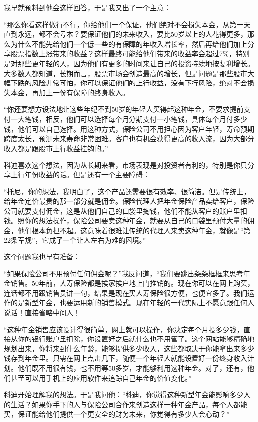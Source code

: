 我早就预料到他会这样回答，于是我又出了一个主意：

“那么你看这样做行不行，你给他们一个保证，他们绝对不会损失本金，从第一天直到永远，都不会亏本？要保证他们的未来收入，要比50岁以上的人花得更多，那么为什么不能先给他们一个低一些的有保障的年收入增长率，然后再给他们加上分享股票指数上涨带来的收益？这样最终可能给他们带来的收益率会超过7\%，特别是对那些更年轻的人，因为他们有更多的时间来让自己的投资持续地按复利增长。大多数人都知道，长期而言，股票市场会创造最高的增长，但是问题是那些股市大幅下跌的风险非常可怕，你可以保证他们的上行收益，没有下行风险，绝对不会损失本金，再加上一份有保障的终身收入。

“你还要想方设法地让这些年纪不到50岁的年轻人买得起这种年金，不要求提前支付一大笔钱，相反，他们可以选择每个月分期支付一小笔钱，具体每个月付多少钱，他们可以自己选择。用这种方式，保险公司不用担心因为客户年轻，寿命预期跨度太长，预测未来寿命非常困难。客户也有机会获得更高的收入流，因为大部分收入都是跟股市上行收益挂钩的。”

科迪喜欢这个想法，因为从长期来看，市场表现是对投资者有利的，特别是你只分享上行年份收益的话。但是还有一个主要障碍：

“托尼，你的想法，我明白了，这个产品还需要很有效率、很简洁。但是传统上，给年金定价最贵的那一部分就是佣金。保险代理人把年金保险产品卖给客户，保险公司就要支付佣金，这是从他们自己的口袋里掏钱，他们不能从客户的账户里扣钱。照你的想法操作，保险公司要卖这种年金，就要从自己的口袋里预付大量的佣金，他们根本负担不起。这意味着很难让传统的代理人来卖这种年金，就像是“第22条军规”，它成了一个让人左右为难的困境。”

这个问题我也早有准备：

“如果保险公司不用预付任何佣金呢？”我反问道，“我们要跳出条条框框来思考年金销售。50年前，人寿保险都是挨家挨户地上门推销的。现在你可以在网上购买，连话都不用跟销售员讲一句，结果是现在买人寿保险很方便，也便宜多了。我们运作的是新型年金，也要运用新的销售模式。现在年轻的一代实际上不愿意跟任何人说话！直接省略中间人！

“这种年金销售应该设计得很简单，网上就可以操作，你决定每个月投多少钱，直接从你的银行账户里扣除，你设置好之后就什么也不用管了。这个网站能够精确地规划出来，你将来到什么年龄，能够提供多少收入，这些都取决于你能拿出来多少钱存到年金里。只需在网上点击几下，随便一个年轻人就能设置好一份终身收入计划。他们既不用很有钱，也不用等50多岁，才能够利用这种年金。对了，还有，他们甚至可以用手机上的应用软件来追踪自己年金的价值变化。”

科迪开始理解我的想法。于是我问他：“科迪，你觉得这种新型年金能影响多少人的生活？如果你手下的人与保险公司合作来创造这样一种年金产品，每个人都能买，保证能给他们提供一个更安全的财务未来，你觉得有多少人会心动？”

